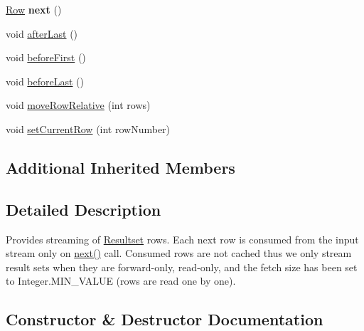 \begin{DoxyCompactItemize}
\mbox{\hyperlink{interfacecom_1_1mysql_1_1cj_1_1result_1_1_row}{Row}} {\bfseries next} ()
\item 
void \mbox{\hyperlink{classcom_1_1mysql_1_1cj_1_1protocol_1_1a_1_1result_1_1_resultset_rows_streaming_af58c1ee8e6bddf5ef73508bc9292a0a2}{after\+Last}} ()
\item 
void \mbox{\hyperlink{classcom_1_1mysql_1_1cj_1_1protocol_1_1a_1_1result_1_1_resultset_rows_streaming_a09c61e1550747c9af885193ffe222c04}{before\+First}} ()
\item 
void \mbox{\hyperlink{classcom_1_1mysql_1_1cj_1_1protocol_1_1a_1_1result_1_1_resultset_rows_streaming_a11ccbda4e0c40207c02253c5a2931748}{before\+Last}} ()
\item 
void \mbox{\hyperlink{classcom_1_1mysql_1_1cj_1_1protocol_1_1a_1_1result_1_1_resultset_rows_streaming_a737e87ca2de64978c94ecd245f1b9cf4}{move\+Row\+Relative}} (int rows)
\item 
void \mbox{\hyperlink{classcom_1_1mysql_1_1cj_1_1protocol_1_1a_1_1result_1_1_resultset_rows_streaming_ac2448082c41dad09ccd418eaf3f400e0}{set\+Current\+Row}} (int row\+Number)
\end{DoxyCompactItemize}
\subsection*{Additional Inherited Members}


\subsection{Detailed Description}
Provides streaming of \mbox{\hyperlink{interfacecom_1_1mysql_1_1cj_1_1protocol_1_1_resultset}{Resultset}} rows. Each next row is consumed from the input stream only on \mbox{\hyperlink{}{next()}} call. Consumed rows are not cached thus we only stream result sets when they are forward-\/only, read-\/only, and the fetch size has been set to Integer.\+M\+I\+N\+\_\+\+V\+A\+L\+UE (rows are read one by one). 

\subsection{Constructor \& Destructor Documentation}
\mbox{\label{classcom_1_1mysql_1_1cj_1_1protocol_1_1a_1_1result_1_1_resultset_rows_streaming_a2fd06d15f9d59ed1e807189b556357f4}} 
